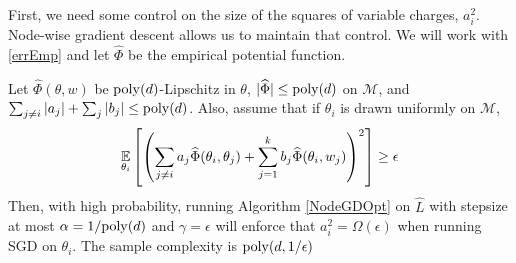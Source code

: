 First, we need some control on the size of the squares of variable charges, $a_i^2$. Node-wise gradient descent allows us to maintain that control. We will work with \eqref{errEmp} and let $\widehat{\Phi}$ be the empirical potential function.

\begin{theorem}\label{nonDecrease} 
  Let $\widehat{\Phi}(\theta, w)$ be $\mathrm{poly}(d)$-Lipschitz in $\theta$,
  $|\widehat{\Phi}| \leq \mathrm{poly}(d)$ on $\mathcal{M}$, and $\sum_{j \neq i} |a_j| + \sum_j |b_j| \leq \mathrm{poly}(d)$. Also, assume that if $\theta_i$ is drawn uniformly on $\mathcal{M}$,
%
\[\operatorname*{\mathbb{E}}_{\theta_i}\left[\left(  \sum_{j\neq i} a_j \widehat{\Phi}(\theta_i,\theta_j) + \sum_{j=1}^k b_j \widehat{\Phi}(\theta_i,w_j)\right)^2\right] \geq \epsilon \]
%
Then, with high probability, running Algorithm \ref{NodeGDOpt} on $\widehat{L}$ with stepsize at most $\alpha = 1/\mathrm{poly}(d)$ and $\gamma = \epsilon$ will enforce that $a_i^2 = \Omega(\epsilon)$ when running SGD on $\theta_i$. The sample complexity is $\mathrm{poly}(d,1/\epsilon)$
\end{theorem}


